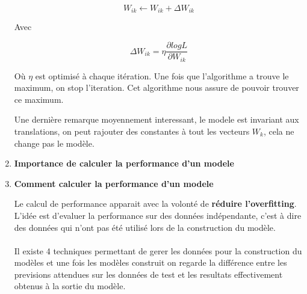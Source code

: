 \documentclass[a4paper, 11pt, onecolumn]{article}
\begin{document}
\begin{enumerate}
$$W_{ik} \leftarrow W_{ik} + \Delta  W_{ik}$$

Avec

$$\Delta  W_{ik} = \eta \frac{\partial log L}{\partial W_{ik}}$$

Où $\eta$ est optimisé à chaque itération. Une fois que l'algorithme a trouve le maximum, on stop l'iteration. Cet algorithme nous assure de pouvoir trouver ce maximum.

Une dernière remarque moyennement interessant, le modele est invariant aux translations, on peut rajouter des constantes à tout les vecteurs $W_k$, cela ne change pas le modèle.

\item \textbf{Importance de calculer la performance d'un modele}


\item \textbf{Comment calculer la performance d'un modele}

  Le calcul de performance apparait avec la volonté de \textbf{réduire l'overfitting}. L'idée est d'evaluer la performance sur des données indépendante, c'est à dire des données qui n'ont pas été utilisé lors de la construction du modèle.

  \paragraph{}
Il existe 4 techniques permettant de gerer les données pour la construction du modèles et une fois les modèles construit on regarde la différence entre les previsions attendues sur les données de test et les resultats effectivement obtenus à la sortie du modèle.


\end{enumerate}
\end{document}
